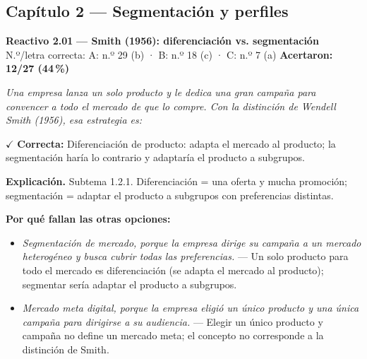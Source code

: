 \documentclass[10pt,letterpaper]{article}
\begin{document}
\subsection*{\color{guinda}Capítulo 2 — Segmentación y perfiles}
\begin{minipage}{\textwidth}
{\color{guinda}\textbf{Reactivo 2.01}} \textbf{— Smith (1956): diferenciación vs. segmentación}\\[-1pt]
{\scriptsize N.º/letra correcta: A: n.º 29 (b) · B: n.º 18 (c) · C: n.º 7 (a) \hfill \textbf{Acertaron: 12/27 (44\,\%)}}

\textit{Una empresa lanza un solo producto y le dedica una gran campaña para convencer a todo el mercado de que lo compre. Con la distinción de Wendell Smith (1956), esa estrategia es:}

\textcolor{verde}{$\checkmark$} \textbf{Correcta:} Diferenciación de producto: adapta el mercado al producto; la segmentación haría lo contrario y adaptaría el producto a subgrupos.

\textbf{Explicación.} Subtema 1.2.1. Diferenciación = una oferta y mucha promoción; segmentación = adaptar el producto a subgrupos con preferencias distintas.

\textbf{Por qué fallan las otras opciones:}
\begin{itemize}[itemsep=0pt,topsep=1pt,leftmargin=1.3em,parsep=0pt]
\item[\textcolor{rojo}{$\times$}] \textit{Segmentación de mercado, porque la empresa dirige su campaña a un mercado heterogéneo y busca cubrir todas las preferencias.} --- Un solo producto para todo el mercado es diferenciación (se adapta el mercado al producto); segmentar sería adaptar el producto a subgrupos.
\item[\textcolor{rojo}{$\times$}] \textit{Mercado meta digital, porque la empresa eligió un único producto y una única campaña para dirigirse a su audiencia.} --- Elegir un único producto y campaña no define un mercado meta; el concepto no corresponde a la distinción de Smith.
\end{itemize}
\end{minipage}\par\vspace{5pt}{\color{gray!40}\hrule}\vspace{5pt}
\end{document}
